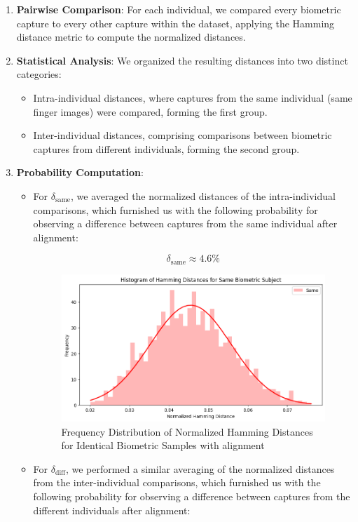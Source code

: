 \begin{enumerate}
    \item \textbf{Pairwise Comparison}: For each individual, we compared every biometric capture to every other capture within the dataset, applying the Hamming distance metric to compute the normalized distances.
    \item \textbf{Statistical Analysis}: We organized the resulting distances into two distinct categories:
    \begin{itemize}
        \item Intra-individual distances, where captures from the same individual (same finger images) were compared, forming the first group.
        \item Inter-individual distances, comprising comparisons between biometric captures from different individuals, forming the second group.
    \end{itemize}
    \newpage
    \item \textbf{Probability Computation}:
    \begin{itemize}
        \item For \( \delta_{\text{same}} \), we averaged the normalized distances of the intra-individual comparisons, which furnished us with the following probability for observing a difference between captures from the same individual after alignment:

        \[ \delta_{\text{same}} \approx 4.6\% \]

        \begin{figure}[H]
            \centering
            \includegraphics[width=0.7\linewidth]{latex-img/delta_same.png}
            \caption{Frequency Distribution of Normalized Hamming Distances for Identical Biometric Samples with alignment}
            \label{delta_same}
        \end{figure}
        
        \item For \( \delta_{\text{diff}} \), we performed a similar averaging of the normalized distances from the inter-individual comparisons, which furnished us with the following probability for observing a difference between captures from the different individuals after alignment:


\end{itemize}
\end{enumerate}
